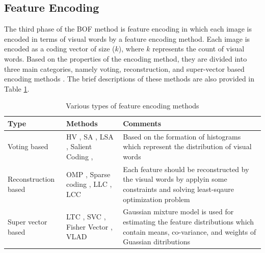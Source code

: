 \subsection{Feature Encoding}\label{subsec:Feature Encoding}

The third phase of the BOF method is feature encoding in which each image is encoded in terms of visual words by a feature encoding method.  Each image is encoded as a coding vector of size ($k$), where $k$ represents the count of visual words. Based on the properties of the encoding method, they are divided into three main categories, namely voting, reconstruction, and super-vector based encoding methods \cite{peng2016}. The brief descriptions of these methods are also provided in Table \ref{Tab:encoding}. 

\begin{table}
\renewcommand{\arraystretch}{1.5}
\caption[Various types of feature encoding methods]{\fontsize{10pt}{12pt}\selectfont Various types of feature encoding methods  \cite{huang2014, peng2016}}
\label{Tab:encoding}
\centering
\footnotesize{
\begin{tabular}{p{2.5cm}|p{5cm}|p{7.2cm}}
     \hline
    \textbf{Type} &\textbf{Methods}  &  \textbf{Comments}\\
     \hline 
    Voting based & HV \cite{sivic2003}, SA \cite{Gemert2010}, LSA \cite{Liu2011}, Salient Coding \cite{Huang2011salient},  & Based on the formation of histograms which represent the distribution of visual words\\

Reconstruction based & OMP \cite{Tropp2007}, Sparse coding  \cite{Yang2009}, LLC \cite{Yu2009}, LCC \cite{Wang2010} &  Each feature should be reconstructed by the visual words by applyin some constraints and solving least-sqaure optimization problem \\

Super vector based & LTC \cite{Yu2010}, SVC \cite{Zhou2010}, Fisher Vector \cite{Perronnin2010}, VLAD \cite{Jegou_2012} & Gaussian mixture model is used for estimating the feature distributions which contain means, co-variance, and weights of Guassian ditributions \\
 \hline
\end{tabular}
}
\end{table}


